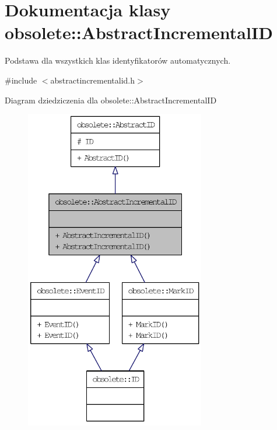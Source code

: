 \hypertarget{classobsolete_1_1AbstractIncrementalID}{
\section{Dokumentacja klasy obsolete::AbstractIncrementalID}
\label{classobsolete_1_1AbstractIncrementalID}
}


Podstawa dla wszystkich klas identyfikatorów automatycznych.  




{\ttfamily \#include $<$abstractincrementalid.h$>$}



Diagram dziedziczenia dla obsolete::AbstractIncrementalID\nopagebreak
\begin{figure}[H]
\begin{center}
\leavevmode
\includegraphics[height=400pt]{classobsolete_1_1AbstractIncrementalID__inherit__graph}
\end{center}
\end{figure}


